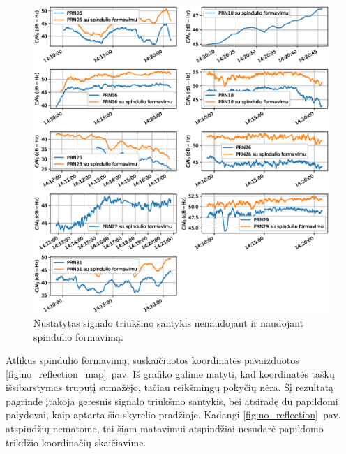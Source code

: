 \documentclass[main.tex]{subfiles}
\begin{document}
\begin{figure}[ht]
    \begin{centering}
    \includegraphics[scale=0.6]{drawings/no_refelection_snr}
    \par\end{centering}
    \protect\caption{\label{fig:no_reflection_snr}Nustatytas signalo triukšmo santykis nenaudojant ir naudojant spindulio formavimą.}
\end{figure}

Atlikus spindulio formavimą, suskaičiuotos koordinatės pavaizduotos \ref{fig:no_reflection_map}~pav.
Iš grafiko galime matyti, kad koordinatės taškų išsibarstymas truputį sumažėjo, tačiau reikšmingų
pokyčių nėra. Šį rezultatą pagrinde įtakoja geresnis signalo triukšmo santykis, bei atsiradę du papildomi
palydovai, kaip aptarta šio skyrelio pradžioje. Kadangi \ref{fig:no_reflection}~pav. atspindžių
nematome, tai šiam matavimui atspindžiai nesudarė papildomo trikdžio koordinačių skaičiavime.
\end{document}
